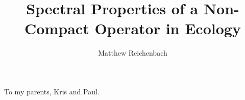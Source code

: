 \documentclass[final]{nuthesis}
\theoremstyle{definition}
\numberwithin{theorem}{section}
\numberwithin{lemma}{section}
\numberwithin{corollary}{section}
\numberwithin{definition}{section}
\numberwithin{equation}{section}
\begin{document}
\frontmatter

\title{Spectral Properties of a Non-Compact Operator in Ecology}
\author{Matthew Reichenbach}
\maketitle



\begin{dedication}
    \begin{center}
    	To my parents, Kris and Paul.
    \end{center}
\end{dedication}
\end{document}
